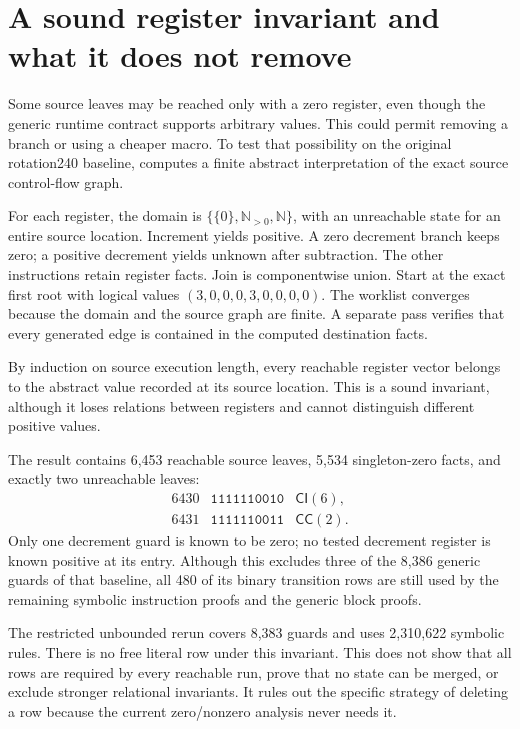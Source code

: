 \documentclass[11pt,a4paper]{article}
\theoremstyle{definition}
\newcommand{\CI}{\mathsf{CI}}
\newcommand{\CC}{\mathsf{CC}}
\newcommand{\file}[1]{\texttt{\path{#1}}}
\begin{document}





\section{A sound register invariant and what it does not remove}
\label{sec:abstract}

Some source leaves may be reached only with a zero register, even though
the generic runtime contract supports arbitrary values.  This could permit
removing a branch or using a cheaper macro.  To test that possibility on the original rotation240 baseline,
\file{semantic/abstract_zeros.py} computes a finite abstract interpretation
of the exact source control-flow graph.

For each register, the domain is
$\{\{0\},\mathbb N_{>0},\mathbb N\}$, with an unreachable state for an
entire source location.  Increment yields positive.  A zero decrement
branch keeps zero; a positive decrement yields unknown after subtraction.
The other instructions retain register facts.  Join is componentwise
union.  Start at the exact first root with logical values
$(3,0,0,0,3,0,0,0,0)$.  The worklist converges because the domain and the
source graph are finite.  A separate pass verifies that every generated
edge is contained in the computed destination facts.

By induction on source execution length, every reachable register vector
belongs to the abstract value recorded at its source location.  This is a
sound invariant, although it loses relations between registers and cannot
distinguish different positive values.

The result contains 6,453 reachable source leaves, 5,534 singleton-zero
facts, and exactly two unreachable leaves:
\[
\begin{array}{ccl}
6430 & \mathtt{1111110010} & \CI(6),\\
6431 & \mathtt{1111110011} & \CC(2).
\end{array}
\]
Only one decrement guard is known to be zero; no tested decrement register
is known positive at its entry.  Although this excludes three of the
8,386 generic guards of that baseline, all 480 of its binary transition rows are still used by the
remaining symbolic instruction proofs and the generic block proofs.

The restricted unbounded rerun covers 8,383 guards and uses 2,310,622
symbolic rules.  There is no free literal row under this invariant.  This
does not show that all rows are required by every reachable run, prove
that no state can be merged, or exclude stronger relational invariants.
It rules out the specific strategy of deleting a row because the current
zero/nonzero analysis never needs it.
\end{document}
